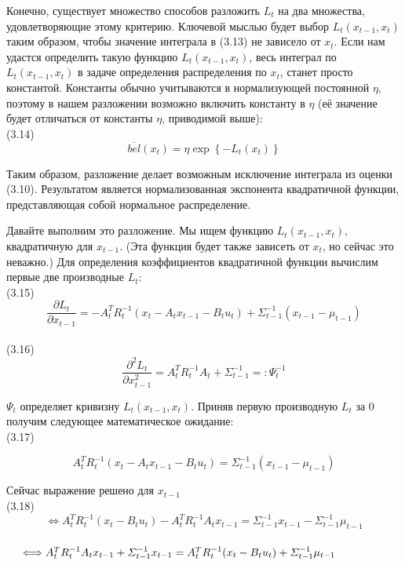 \documentclass[10pt,a4paper]{article}
\begin{document}
Конечно, существует множество способов разложить $L_t$ на два множества, удовлетворяющие этому критерию. Ключевой мыслью будет выбор $L_t(x_{t-1},x_t)$ таким образом, чтобы значение интеграла в (3.13) не зависело от  $x_t$. Если нам удастся определить такую функцию $L_t(x_{t-1} ,x_t)$, весь интеграл по $L_t(x_{t-1},x_t)$ в задаче определения распределения по $x_t$, станет просто константой. Константы обычно учитываются в нормализующей постоянной $\eta$, поэтому в нашем разложении возможно включить константу в $\eta$ (её значение будет отличаться от константы $\eta$, приводимой выше):\\

(3.14)
$$\overline{bel}(x_t)=\eta \exp\left\lbrace -L_t(x_t)\right\rbrace $$

Таким образом, разложение делает возможным исключение интеграла из оценки (3.10). Результатом является нормализованная экспонента квадратичной функции, представляющая собой нормальное распределение.

Давайте выполним это разложение. Мы ищем функцию $L_t(x_{t-1},x_t)$, квадратичную для $x_{t-1}$. (Эта функция будет также зависеть от $x_t$, но сейчас это неважно.) Для определения коэффициентов квадратичной функции вычислим первые две производные $L_t$:\\

(3.15)
$$\frac{\partial L_t}{\partial x_{t-1}}=-A_t^T R_t^{-1}(x_t-A_t x_{t-1}-B_t u_t)+\varSigma_{t-1}^{-1}(x_{t-1}-\mu_{t-1})$$\\

(3.16)
$$\frac{\partial^2 L_t}{\partial x_{t-1}^2}=A_t^T R_t^{-1}A_t+\varSigma_{t-1}^{-1}=:\varPsi_t^{-1}$$

$\varPsi_t$ определяет кривизну $L_t(x_{t-1},x_t)$. Приняв первую производную $L_t$ за 0 получим следующее математическое ожидание:\\

(3.17)

$$A_t^T R_t^{-1}(x_t-A_t x_{t-1}-B_t u_t)=\varSigma_{t-1}^{-1}(x_{t-1}-\mu_{t-1})$$

Сейчас выражение решено для $x_{t-1}$\\

(3.18)\\
$$\Longleftrightarrow A_t^T R_t^{-1}(x_t-B_t u_t)-A_t^T R_t^{-1}A_t x_{t-1}=\varSigma_{t-1}^{-1}x_{t-1}-\varSigma_{t-1}^{-1}\mu_{t-1}$$\\

$\hspace{5mm}\Longleftrightarrow A_t^T R_t^{-1}A_t x_{t-1}+\varSigma_{t-1}^{-1}x_{t-1}=A_t^T R_t^{-1}(x_t-B_t u_t)+\varSigma_{t-1}^{-1}\mu_{t-1}$\\
\end{document}
